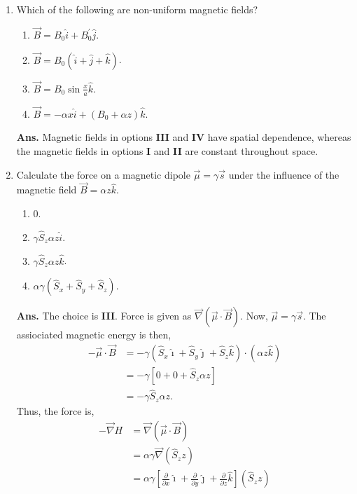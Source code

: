 \documentclass[12pt]{article}
\newcommand\hs{\hat{S}}
\newcommand\tbf[1]{\textbf{#1}}
\newcommand\tans{\tbf{Ans. }}
\newcommand\del{\partial}
\newcommand\Del{\nabla}
\newcommand\ddel[1]{\frac{\del}{\del {#1}}}
\begin{document}
\begin{enumerate}[\bf 1.]
\vspace{1cm}
\item Which of the following are non-uniform magnetic fields?
\begin{enumerate}[\bf I.]
\item $\vec{B} = B_0 \hat{i} + B_0^{'}\hat{j}$.
\item $\vec{B} = B_0 \left( \hat{i} + \hat{j} + \hat{k} \right )$.
\item $\vec{B} = B_0 \sin{\frac{x}{a}} \hat{k}$.
\item $\vec{B} = -\alpha x \hat{i} + \left(B_0 + \alpha z \right) \hat{k}$.
\end{enumerate}
\vspace{0.5cm}
\tans Magnetic fields in options \tbf{III} and \tbf{IV} have spatial dependence, whereas the magnetic fields in options \tbf{I} and \tbf{II} are constant throughout space.
\vspace{1cm}
\item Calculate the force on a magnetic dipole $\vec{\mu} = \gamma \vec{s}$ under the influence of the magnetic field $ \vec{B} = \alpha z \hat{k}$.
\begin{enumerate}[\bf I.]
\item $0$.
\item $\gamma \hs_z \alpha z \hat{i}$.
\item $\gamma \hs_z \alpha z \hat{k}$.
\item $\alpha \gamma \left(\hs_x + \hs_y + \hs_z\right)$.
\end{enumerate}
\vspace{0.5cm}
\tans The choice is \tbf{III}. Force is given as $\vec{\Del}\left(\vec{\mu}\cdot\vec{B}\right)$. Now, $\vec{\mu} = \gamma \vec{s}$.
The assiociated magnetic energy is then,
$$
\begin{aligned}
-\vec{\mu} \cdot \vec{B} &= -\gamma \left(\hs_x \hat{\imath} + \hs_y \hat{\jmath} + \hs_z \hat{k} \right) \cdot (\alpha z \hat{k}) \\
&= -\gamma \left[0 + 0 + \hs_z \alpha z \right] \\
&= -\gamma \hs_z \alpha z.
\end{aligned}
$$
Thus, the force is,
$$
   \begin{aligned}
    -\vec{\Del}H &= \vec{\Del}\left(\vec{\mu}\cdot\vec{B}\right) \\
    &= \alpha \gamma \vec{\Del} \left(\hs_z z\right) \\
    &= \alpha \gamma \left[ \ddel{x}\hat{\imath}+\ddel{y}\hat{\jmath}+\ddel{z}\hat{k} \right] \left(\hs_z z \right) \\

\end{aligned}$$
\end{enumerate}
\end{document}
